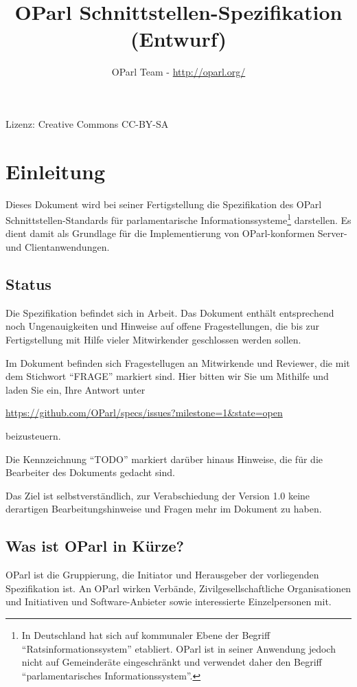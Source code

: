 \documentclass[,a4paper]{article}
\title{OParl Schnittstellen-Spezifikation (Entwurf)}
\author{OParl Team - \url{http://oparl.org/}}
\date{}
\begin{document}
\maketitle

Lizenz: Creative Commons CC-BY-SA

\section{Einleitung}\label{einleitung}

Dieses Dokument wird bei seiner Fertigstellung die Spezifikation des
OParl Schnittstellen-Standards für parlamentarische
Informationssysteme\footnote{In Deutschland hat sich auf kommunaler
  Ebene der Begriff ``Ratsinformationssystem'' etabliert. OParl ist in
  seiner Anwendung jedoch nicht auf Gemeinderäte eingeschränkt und
  verwendet daher den Begriff ``parlamentarisches Informationssystem''.}
darstellen. Es dient damit als Grundlage für die Implementierung von
OParl-konformen Server- und Clientanwendungen.

\subsection{Status}\label{status}

Die Spezifikation befindet sich in Arbeit. Das Dokument enthält
entsprechend noch Ungenauigkeiten und Hinweise auf offene
Fragestellungen, die bis zur Fertigstellung mit Hilfe vieler
Mitwirkender geschlossen werden sollen.

Im Dokument befinden sich Fragestellugen an Mitwirkende und Reviewer,
die mit dem Stichwort ``FRAGE'' markiert sind. Hier bitten wir Sie um
Mithilfe und laden Sie ein, Ihre Antwort unter

\url{https://github.com/OParl/specs/issues?milestone=1\&state=open}

beizusteuern.

Die Kennzeichnung ``TODO'' markiert darüber hinaus Hinweise, die für die
Bearbeiter des Dokuments gedacht sind.

Das Ziel ist selbstverständlich, zur Verabschiedung der Version 1.0
keine derartigen Bearbeitungshinweise und Fragen mehr im Dokument zu
haben.

\subsection{Was ist OParl in Kürze?}\label{was-ist-oparl-in-kuxfcrze}

OParl ist die Gruppierung, die Initiator und Herausgeber der
vorliegenden Spezifikation ist. An OParl wirken Verbände,
Zivilgesellschaftliche Organisationen und Initiativen und
Software-Anbieter sowie interessierte Einzelpersonen mit.
\end{document}
